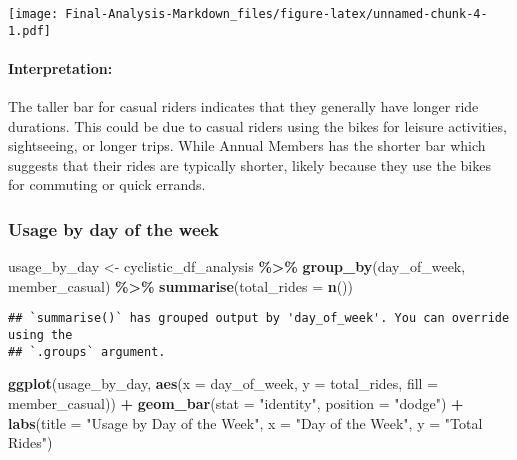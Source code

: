 \documentclass[
]{article}
\newenvironment{Shaded}{\begin{snugshade}}{\end{snugshade}}
\newcommand{\AttributeTok}[1]{\textcolor[rgb]{0.13,0.29,0.53}{#1}}
\newcommand{\FunctionTok}[1]{\textcolor[rgb]{0.13,0.29,0.53}{\textbf{#1}}}
\newcommand{\NormalTok}[1]{#1}
\newcommand{\OtherTok}[1]{\textcolor[rgb]{0.56,0.35,0.01}{#1}}
\newcommand{\SpecialCharTok}[1]{\textcolor[rgb]{0.81,0.36,0.00}{\textbf{#1}}}
\newcommand{\StringTok}[1]{\textcolor[rgb]{0.31,0.60,0.02}{#1}}
\begin{document}
\texttt{[image: Final-Analysis-Markdown\_files/figure-latex/unnamed-chunk-4-1.pdf]}

\paragraph{Interpretation:}\label{interpretation-1}

The taller bar for casual riders indicates that they generally have
longer ride durations. This could be due to casual riders using the
bikes for leisure activities, sightseeing, or longer trips. While Annual
Members has the shorter bar which suggests that their rides are
typically shorter, likely because they use the bikes for commuting or
quick errands.

\subsubsection{Usage by day of the week}\label{usage-by-day-of-the-week}

\begin{Shaded}
\begin{Highlighting}[]
\NormalTok{usage\_by\_day }\OtherTok{\textless{}{-}}\NormalTok{ cyclistic\_df\_analysis }\SpecialCharTok{\%\textgreater{}\%}
  \FunctionTok{group\_by}\NormalTok{(day\_of\_week, member\_casual) }\SpecialCharTok{\%\textgreater{}\%}
  \FunctionTok{summarise}\NormalTok{(}\AttributeTok{total\_rides =} \FunctionTok{n}\NormalTok{())}
\end{Highlighting}
\end{Shaded}

\begin{verbatim}
## `summarise()` has grouped output by 'day_of_week'. You can override using the
## `.groups` argument.
\end{verbatim}

\begin{Shaded}
\begin{Highlighting}[]
\FunctionTok{ggplot}\NormalTok{(usage\_by\_day, }\FunctionTok{aes}\NormalTok{(}\AttributeTok{x =}\NormalTok{ day\_of\_week, }\AttributeTok{y =}\NormalTok{ total\_rides, }\AttributeTok{fill =}\NormalTok{ member\_casual)) }\SpecialCharTok{+}
  \FunctionTok{geom\_bar}\NormalTok{(}\AttributeTok{stat =} \StringTok{"identity"}\NormalTok{, }\AttributeTok{position =} \StringTok{"dodge"}\NormalTok{) }\SpecialCharTok{+}
  \FunctionTok{labs}\NormalTok{(}\AttributeTok{title =} \StringTok{"Usage by Day of the Week"}\NormalTok{, }\AttributeTok{x =} \StringTok{"Day of the Week"}\NormalTok{, }\AttributeTok{y =} \StringTok{"Total Rides"}\NormalTok{)}
\end{Highlighting}
\end{Shaded}
\end{document}
